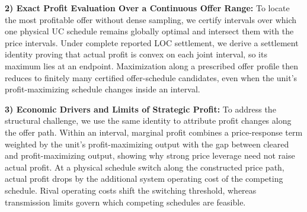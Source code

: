 \documentclass[journal]{IEEEtran}
\begin{document}
\textbf{2) Exact Profit Evaluation Over a Continuous Offer Range:}
To locate the most profitable offer without dense sampling, we certify intervals over which one physical UC schedule remains globally optimal and intersect them with the price intervals. Under complete reported LOC settlement, we derive a settlement identity proving that actual profit is convex on each joint interval, so its maximum lies at an endpoint. Maximization along a prescribed offer profile then reduces to finitely many certified offer-schedule candidates, even when the unit's profit-maximizing schedule changes inside an interval.

\textbf{3) Economic Drivers and Limits of Strategic Profit:}
To address the structural challenge, we use the same identity to attribute profit changes along the offer path. Within an interval, marginal profit combines a price-response term weighted by the unit's profit-maximizing output with the gap between cleared and profit-maximizing output, showing why strong price leverage need not raise actual profit. At a physical schedule switch along the constructed price path, actual profit drops by the additional system operating cost of the competing schedule. Rival operating costs shift the switching threshold, whereas transmission limits govern which competing schedules are feasible.


\end{document}
